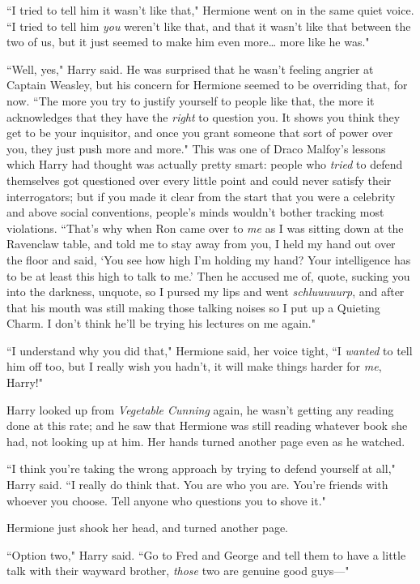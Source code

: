 ``I tried to tell him it wasn't like that," Hermione went on in the same quiet voice. ``I tried to tell him \emph{you} weren't like that, and that it wasn't like that between the two of us, but it just seemed to make him even more{\ldots} more like he was."

``Well, yes," Harry said. He was surprised that he wasn't feeling angrier at Captain Weasley, but his concern for Hermione seemed to be overriding that, for now. ``The more you try to justify yourself to people like that, the more it acknowledges that they have the \emph{right} to question you. It shows you think they get to be your inquisitor, and once you grant someone that sort of power over you, they just push more and more." This was one of Draco Malfoy's lessons which Harry had thought was actually pretty smart: people who \emph{tried} to defend themselves got questioned over every little point and could never satisfy their interrogators; but if you made it clear from the start that you were a celebrity and above social conventions, people's minds wouldn't bother tracking most violations. ``That's why when Ron came over to \emph{me} as I was sitting down at the Ravenclaw table, and told me to stay away from you, I held my hand out over the floor and said, `You see how high I'm holding my hand? Your intelligence has to be at least this high to talk to me.' Then he accused me of, quote, sucking you into the darkness, unquote, so I pursed my lips and went \emph{schluuuuurp}, and after that his mouth was still making those talking noises so I put up a Quieting Charm. I don't think he'll be trying his lectures on me again."

``I understand why you did that," Hermione said, her voice tight, ``I \emph{wanted} to tell him off too, but I really wish you hadn't, it will make things harder for \emph{me}, Harry!"

Harry looked up from \emph{Vegetable Cunning} again, he wasn't getting any reading done at this rate; and he saw that Hermione was still reading whatever book she had, not looking up at him. Her hands turned another page even as he watched.

``I think you're taking the wrong approach by trying to defend yourself at all," Harry said. ``I really do think that. You are who you are. You're friends with whoever you choose. Tell anyone who questions you to shove it."

Hermione just shook her head, and turned another page.

``Option two," Harry said. ``Go to Fred and George and tell them to have a little talk with their wayward brother, \emph{those} two are genuine good guys—"

